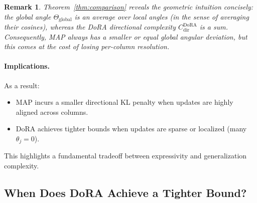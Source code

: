 \documentclass[11pt]{article}
\newtheorem{remark}[theorem]{Remark}
\begin{document}
\begin{remark}
Theorem~\ref{thm:comparison} reveals the geometric intuition concisely:
the global angle $\Theta_{\mathrm{global}}$ is an \emph{average} over local
angles (in the sense of averaging their cosines), whereas the DoRA
directional complexity $C^{\mathrm{DoRA}}_{\mathrm{dir}}$ is a \emph{sum}.
Consequently, MAP always has a smaller or equal \emph{global} angular
deviation, but this comes at the cost of losing per-column resolution.
\end{remark}

\paragraph{Implications.}
As a result:
\begin{itemize}
  \item MAP incurs a smaller directional KL penalty when updates are
    highly aligned across columns.
  \item DoRA achieves tighter bounds when updates are sparse or
    localized (many $\theta_j = 0$).
\end{itemize}
This highlights a fundamental tradeoff between expressivity and
generalization complexity.

\subsection{When Does DoRA Achieve a Tighter Bound?}
\label{sec:dora_advantage}
\end{document}
